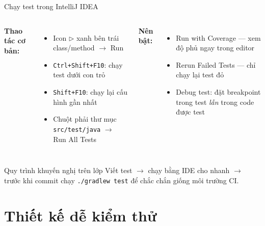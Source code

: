 \documentclass[aspectratio=169,12pt]{beamer}
\begin{document}
\begin{frame}{Chạy test trong IntelliJ IDEA}
  \begin{columns}
    \textbf{Thao tác cơ bản:}
    \begin{itemize}
      \item Icon \(\triangleright\) xanh bên trái class/method
            \(\to\) Run
      \item \texttt{Ctrl+Shift+F10}: chạy test dưới con trỏ
      \item \texttt{Shift+F10}: chạy lại cấu hình gần nhất
      \item Chuột phải thư mục \texttt{src/test/java}
            \(\to\) Run All Tests
    \end{itemize}

    \textbf{Nên bật:}
    \begin{itemize}
      \item Run with Coverage --- xem độ phủ ngay trong editor
      \item Rerun Failed Tests --- chỉ chạy lại test đỏ
      \item Debug test: đặt breakpoint trong test
            \textit{lẫn} trong code được test
    \end{itemize}
  \end{columns}

  \vspace{0.5em}
  \begin{block}{Quy trình khuyến nghị trên lớp}
    Viết test \(\to\) chạy bằng IDE cho nhanh \(\to\) trước khi commit
    chạy \texttt{./gradlew test} để chắc chắn giống môi trường CI.
  \end{block}
\end{frame}

\section{Thiết kế dễ kiểm thử}
\end{document}
